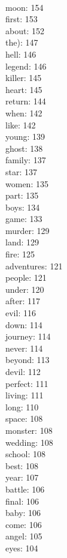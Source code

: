 \begin{multicols}{6}
  \\ moon: 154
  \\ first: 153
  \\ about: 152
  \\ the): 147
  \\ hell: 146
  \\ legend: 146
  \\ killer: 145
  \\ heart: 145
  \\ return: 144
  \\ when: 142
  \\ like: 142
  \\ young: 139
  \\ ghost: 138
  \\ family: 137
  \\ star: 137
  \\ women: 135
  \\ part: 135
  \\ boys: 134
  \\ game: 133
  \\ murder: 129
  \\ land: 129
  \\ fire: 125
  \\ adventures: 121
  \\ people: 121
  \\ under: 120
  \\ after: 117
  \\ evil: 116
  \\ down: 114
  \\ journey: 114
  \\ never: 114
  \\ beyond: 113
  \\ devil: 112
  \\ perfect: 111
  \\ living: 111
  \\ long: 110
  \\ space: 108
  \\ monster: 108
  \\ wedding: 108
  \\ school: 108
  \\ best: 108
  \\ year: 107
  \\ battle: 106
  \\ final: 106
  \\ baby: 106
  \\ come: 106
  \\ angel: 105
  \\ eyes: 104

\end{multicols}
